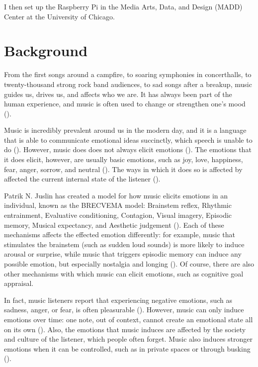\documentclass{article}
\renewcommand{\_}[1]{\underline{ #1 }}
\theoremstyle{definition}
\begin{document}
I then set up the Raspberry Pi in the Media Arts, Data, and Design (MADD) Center at the University of Chicago. 


\section{Background}

From the first songs around a campfire, to soaring symphonies in concerthalls, to twenty-thousand strong rock band audiences, to sad songs after a breakup, music guides us, drives us, and affects who we are. It has always been part of the human experience, and music is often used to change or strengthen one's mood (\cite{huron2011}).

Music is incredibly prevalent around us in the modern day, and it is a language that is able to communicate emotional ideas succinctly, which speech is unable to do (\cite{henson1977}). However, music does does not always elicit emotions (\cite{16juslin2019}). The emotions that it does elicit, however, are usually basic emotions, such as joy, love, happiness, fear, anger, sorrow, and neutral (\cite{sundberg1983}). The ways in which it does so is affected by affected the current internal state of the listener (\cite{harrer1977}). 

Patrik N. Juslin has created a model for how music elicits emotions in an individual, known as the BRECVEMA model: Brainstem reflex, Rhythmic entrainment, Evaluative conditioning, Contagion, Visual imagery, Episodic memory, Musical expectancy, and Aesthetic judgement (\cite{17juslin2019}). Each of these mechanisms affects the effected emotion differently: for example, music that stimulates the brainstem (such as sudden loud sounds) is more likely to induce arousal or surprise, while music that triggers episodic memory can induce any possible emotion, but especially nostalgia and longing (\cite{25juslin2019}). Of course, there are also other mechanisms with which music can elicit emotions, such as cognitive goal appraisal. 

In fact, music listeners report that experiencing negative emotions, such as sadness, anger, or fear, is often pleasurable (\cite{32juslin2019}). However, music can only induce emotions over time: one note, out of context, cannot create an emotional state all on its own (\cite{schubert2001}). Also, the emotions that music induces are affected by the society and culture of the listener, which people often forget. Music also induces stronger emotions when it can be controlled, such as in private spaces or through busking (\cite{oneill2001}). 
\end{document}
